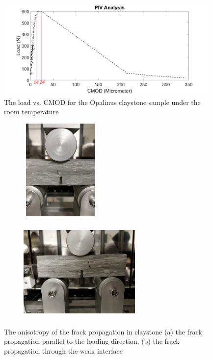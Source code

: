 \begin{figure}[!ht]
\centering
\includegraphics[width=11cm,height=5cm]{figures/Amir_Fracture_Toughness_Result_20.png}
\caption{The load vs. CMOD for the Opalinus claystone sample under the room temperature}
\label{fig:Amir_Fracture_Toughness_Result_20}
\end{figure}

\begin{figure}[!ht]
\centering
\begin{subfigure}[c]{0.43\textwidth}
\centering
\includegraphics[width=4cm,height=5cm]{figures/Amir_Fracture_Toughness_Fracture_a.png}
\subcaption{}
\label{fig:Amir_Fracture_Toughness_Fracture_a}
\end{subfigure}
\hfill
\begin{subfigure}[c]{0.55\textwidth}
\centering
\includegraphics[width=6cm,height=5cm]{figures/Amir_Fracture_Toughness_Fracture_b.png}
\subcaption{}
\label{fig:Amir_Fracture_Toughness_Fracture_b}
\end{subfigure}
\caption{The anisotropy of the frack propagation in claystone (a) the frack propagation parallel to the loading direction, (b) the frack propagation through the weak interface}
\end{figure}


